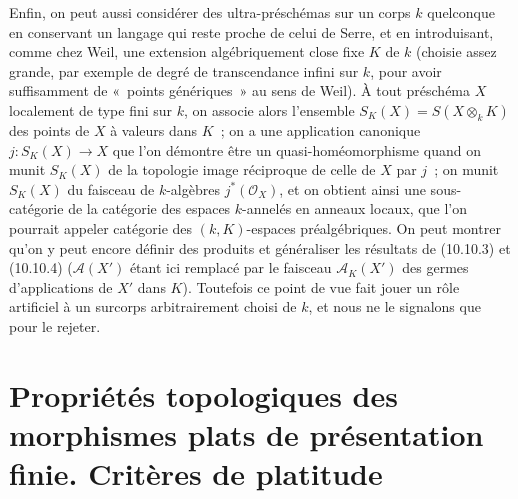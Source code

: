 
\begin{env}[10.10.5]
\label{IV.10.10.5-fr}
Enfin, on peut aussi considérer des ultra-préschémas sur un corps $k$
quelconque en conservant un langage qui reste proche de celui de Serre, et en
introduisant, comme chez Weil, une extension algébriquement close fixe $K$ de
$k$ (choisie assez grande, par exemple de degré de transcendance infini sur
$k$, pour avoir suffisamment de «~points génériques~» au sens de Weil). À tout
préschéma $X$ localement de type fini sur $k$, on associe alors l'ensemble
$S_K(X)=S(X\otimes_kK)$ des points de $X$ à valeurs dans $K$~; on a une
application canonique $j:S_K(X)\to X$ que l'on démontre être un
quasi-homéomorphisme quand on munit $S_K(X)$ de la topologie image réciproque
de celle de $X$ par $j$~; on munit $S_K(X)$ du faisceau de $k$-algèbres
$j^*(\mathcal O_X)$, et on obtient ainsi une sous-catégorie de la catégorie des
espaces $k$-annelés en anneaux locaux, que l'on pourrait appeler catégorie des
$(k,K)$-espaces préalgébriques. On peut montrer qu'on y peut encore définir des
produits et généraliser les résultats de (10.10.3) et (10.10.4)
($\mathcal A(X')$ étant ici remplacé par le faisceau $\mathcal A_K(X')$ des
germes d'applications de $X'$ dans $K$). Toutefois ce point de vue fait jouer
un rôle artificiel à un surcorps arbitrairement choisi de $k$, et nous ne le
signalons que pour le rejeter.
\end{env}

\section{Propriétés topologiques des morphismes plats de présentation finie. Critères de platitude}
\label{section:IV.11-fr}

